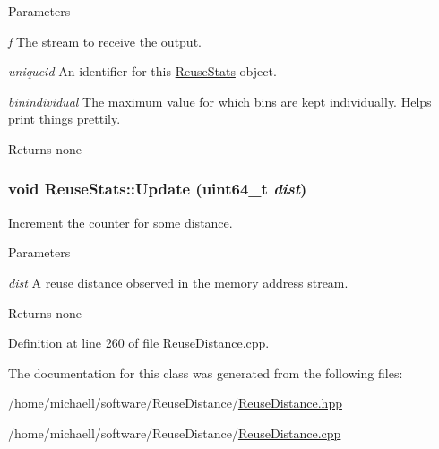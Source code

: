 \begin{DoxyParams}{Parameters}
\item[{\em f}]The stream to receive the output. \item[{\em uniqueid}]An identifier for this \hyperlink{class_reuse_stats}{ReuseStats} object. \item[{\em binindividual}]The maximum value for which bins are kept individually. Helps print things prettily.\end{DoxyParams}
\begin{DoxyReturn}{Returns}
none 
\end{DoxyReturn}
\hypertarget{class_reuse_stats_a5383136c63ed260d9aad44a8d048a2ed}{
\subsubsection[{Update}]{\setlength{\rightskip}{0pt plus 5cm}void ReuseStats::Update (uint64\_\-t {\em dist})}}
\label{class_reuse_stats_a5383136c63ed260d9aad44a8d048a2ed}
Increment the counter for some distance.


\begin{DoxyParams}{Parameters}
\item[{\em dist}]A reuse distance observed in the memory address stream.\end{DoxyParams}
\begin{DoxyReturn}{Returns}
none 
\end{DoxyReturn}


Definition at line 260 of file ReuseDistance.cpp.

The documentation for this class was generated from the following files:\begin{DoxyCompactItemize}
\item 
/home/michaell/software/ReuseDistance/\hyperlink{_reuse_distance_8hpp}{ReuseDistance.hpp}\item 
/home/michaell/software/ReuseDistance/\hyperlink{_reuse_distance_8cpp}{ReuseDistance.cpp}\end{DoxyCompactItemize}
